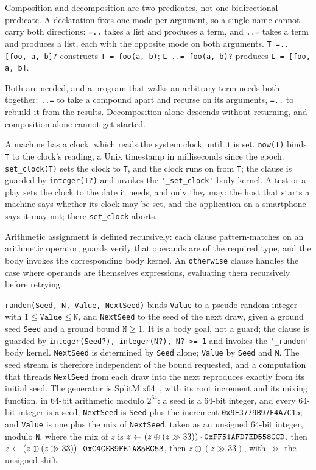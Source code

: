 Composition and decomposition are two predicates, not one bidirectional predicate. A declaration fixes one mode per argument, so a single name cannot carry both directions: \verb|=..| takes a list and produces a term, and \verb|..=| takes a term and produces a list, each with the opposite mode on both arguments. \verb|T =.. [foo, a, b]?| constructs \verb|T = foo(a, b)|; \verb|L ..= foo(a, b)?| produces \verb|L = [foo, a, b]|.

Both are needed, and a program that walks an arbitrary term needs both together: \verb|..=| to take a compound apart and recurse on its arguments, \verb|=..| to rebuild it from the results. Decomposition alone descends without returning, and composition alone cannot get started.

A machine has a clock, which reads the system clock until it is set. \verb|now(T)| binds \verb|T| to the clock's reading, a Unix timestamp in milliseconds since the epoch. \verb|set_clock(T)| sets the clock to \verb|T|, and the clock runs on from \verb|T|; the clause is guarded by \verb|integer(T?)| and invokes the \verb|'_set_clock'| body kernel. A test or a play sets the clock to the date it needs, and only they may: the host that starts a machine says whether its clock may be set, and the application on a smartphone says it may not; there \verb|set_clock| aborts.

Arithmetic assignment is defined recursively: each clause pattern-matches on an arithmetic operator, guards verify that operands are of the required type, and the body invokes the corresponding body kernel. An \verb|otherwise| clause handles the case where operands are themselves expressions, evaluating them recursively before retrying.

\verb|random(Seed, N, Value, NextSeed)| binds \verb|Value| to a pseudo-random integer with $1 \leq \mathtt{Value} \leq \mathtt{N}$, and \verb|NextSeed| to the seed of the next draw, given a ground seed \verb|Seed| and a ground bound $\mathtt{N} \geq 1$. It is a body goal, not a guard; the clause is guarded by \verb|integer(Seed?), integer(N?), N? >= 1| and invokes the \verb|'_random'| body kernel. \verb|NextSeed| is determined by \verb|Seed| alone; \verb|Value| by \verb|Seed| and \verb|N|. The seed stream is therefore independent of the bound requested, and a computation that threads \verb|NextSeed| from each draw into the next reproduces exactly from its initial seed. The generator is SplitMix64~\cite{steele2014splitmix}, with its root increment and its mixing function, in 64-bit arithmetic modulo $2^{64}$: a seed is a 64-bit integer, and every 64-bit integer is a seed; \verb|NextSeed| is \verb|Seed| plus the increment \verb|0x9E3779B97F4A7C15|; and \verb|Value| is one plus the mix of \verb|NextSeed|, taken as an unsigned 64-bit integer, modulo \verb|N|, where the mix of $z$ is $z \leftarrow (z \oplus (z \gg 33)) \cdot \verb|0xFF51AFD7ED558CCD|$, then $z \leftarrow (z \oplus (z \gg 33)) \cdot \verb|0xC4CEB9FE1A85EC53|$, then $z \oplus (z \gg 33)$, with $\gg$ the unsigned shift.

